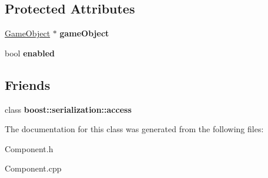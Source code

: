 \subsection*{Protected Attributes}
\begin{DoxyCompactItemize}
\item 
\hypertarget{class_component_af4a2157b3d021916719085f26f1548b0}{
\hyperlink{class_game_object}{GameObject} $\ast$ {\bfseries gameObject}}
\label{class_component_af4a2157b3d021916719085f26f1548b0}

\item 
\hypertarget{class_component_afa65bb278f1e9256d34d6ea008e654ab}{
bool {\bfseries enabled}}
\label{class_component_afa65bb278f1e9256d34d6ea008e654ab}

\end{DoxyCompactItemize}
\subsection*{Friends}
\begin{DoxyCompactItemize}
\item 
\hypertarget{class_component_ac98d07dd8f7b70e16ccb9a01abf56b9c}{
class {\bfseries boost::serialization::access}}
\label{class_component_ac98d07dd8f7b70e16ccb9a01abf56b9c}

\end{DoxyCompactItemize}


The documentation for this class was generated from the following files:\begin{DoxyCompactItemize}
\item 
Component.h\item 
Component.cpp\end{DoxyCompactItemize}
